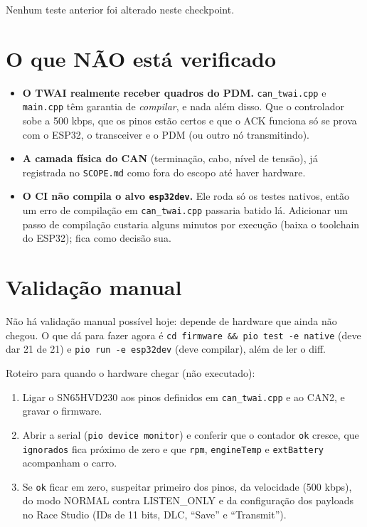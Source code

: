 \documentclass[11pt,a4paper]{article}
\begin{document}
Nenhum teste anterior foi alterado neste checkpoint.

\section{O que NÃO está verificado}

\begin{itemize}
    \item \textbf{O TWAI realmente receber quadros do PDM.} \texttt{can\_twai.cpp} e \texttt{main.cpp} têm garantia de \emph{compilar}, e nada além disso. Que o controlador sobe a 500 kbps, que os pinos estão certos e que o ACK funciona só se prova com o ESP32, o transceiver e o PDM (ou outro nó transmitindo).
    \item \textbf{A camada física do CAN} (terminação, cabo, nível de tensão), já registrada no \texttt{SCOPE.md} como fora do escopo até haver hardware.
    \item \textbf{O CI não compila o alvo \texttt{esp32dev}.} Ele roda só os testes nativos, então um erro de compilação em \texttt{can\_twai.cpp} passaria batido lá. Adicionar um passo de compilação custaria alguns minutos por execução (baixa o toolchain do ESP32); fica como decisão sua.
\end{itemize}

\section{Validação manual}

Não há validação manual possível hoje: depende de hardware que ainda não chegou. O que dá para fazer agora é \texttt{cd firmware \&\& pio test -e native} (deve dar 21 de 21) e \texttt{pio run -e esp32dev} (deve compilar), além de ler o diff.

Roteiro para quando o hardware chegar (não executado):
\begin{enumerate}
    \item Ligar o SN65HVD230 aos pinos definidos em \texttt{can\_twai.cpp} e ao CAN2, e gravar o firmware.
    \item Abrir a serial (\texttt{pio device monitor}) e conferir que o contador \texttt{ok} cresce, que \texttt{ignorados} fica próximo de zero e que \texttt{rpm}, \texttt{engineTemp} e \texttt{extBattery} acompanham o carro.
    \item Se \texttt{ok} ficar em zero, suspeitar primeiro dos pinos, da velocidade (500 kbps), do modo NORMAL contra LISTEN\_ONLY e da configuração dos payloads no Race Studio (IDs de 11 bits, DLC, ``Save'' e ``Transmit'').
\end{enumerate}
\end{document}
